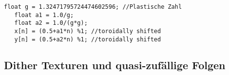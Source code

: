\cite{quasirandomsequencesbyRoberts}
\begin{lstlisting}[style=CStyle]
   float g = 1.32471795724474602596; //Plastische Zahl
   float a1 = 1.0/g;
   float a2 = 1.0/(g*g);
   x[n] = (0.5+a1*n) %1; //toroidally shifted
   y[n] = (0.5+a2*n) %1; //toroidally shifted
\end{lstlisting}


\subsection{Dither Texturen und quasi-zufällige Folgen}
